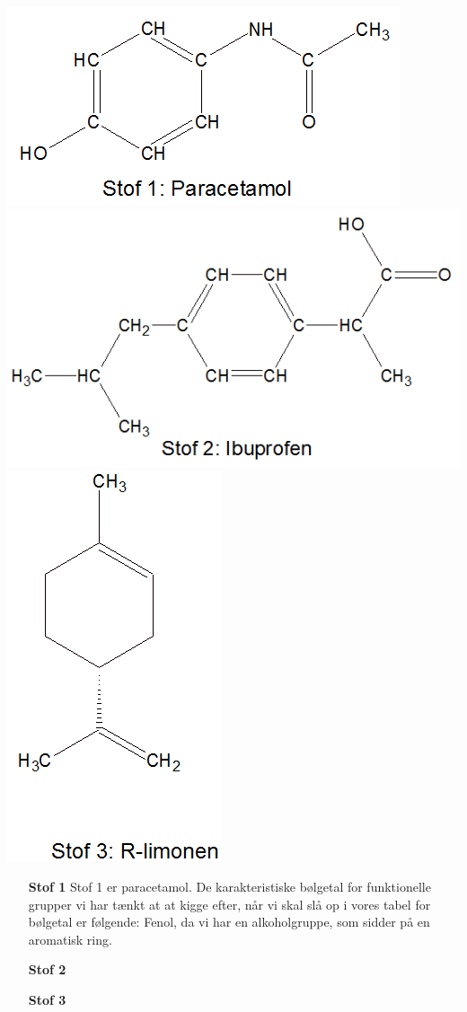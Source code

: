\includegraphics[scale=0.5]{Billeder/paracetamol}
\includegraphics[scale=0.5]{Billeder/ibuprofen}
\includegraphics[scale=0.5]{Billeder/Rlimonen}
\begin{enumerate}
\item[\textbf{Stof 1}] 
Stof 1 er paracetamol. De karakteristiske bølgetal for funktionelle grupper vi har tænkt at at kigge efter, når vi skal slå op i vores tabel for bølgetal er følgende: Fenol, da vi har en alkoholgruppe, som sidder på en aromatisk ring. 
\item[\textbf{Stof 2}]

\item[\textbf{Stof 3}]

\end{enumerate}